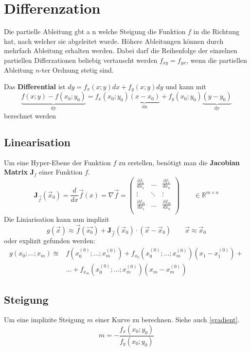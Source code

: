 \section{Differenzation}
Die partielle Ableitung gbt a n welche Steigung die Funktion $f$ in die Richtung hat, nach welcher sie abgeleitet wurde. Höhere Ableitungen können durch mehrfach Ableitung erhalten werden. Dabei darf die Reihenfolge der einzelnen partiellen Differzationen beliebig vertauscht werden $f_{xy} = f_{yx}$, wenn die partiellen Ableitung $n$-ter Ordnung stetig sind.


Das \textbf{Differential}\label{differential} ist $dy = f_x(x;y)dx + f_y(x;y)dy$ und kann mit
\[
\underbrace{f(x;y) - f(x_0;y_0)}_\text{dy} = f_x(x_0; y_0)\underbrace{(x - x_0)}_\text{dx} + f_y(x_0;y_0)\underbrace{(y - y_0)}_\text{dy}
\] berechnet werden

\subsection{Linearisation}
Um eine Hyper-Ebene der Funktion $f$ zu erstellen, benötigt man die \textbf{Jacobian Matrix} $\mathbf{J}_f$ einer Funktion $f$.
\[
\mathbf{J}_{\vec{f}}(\vec{x}_0) = \frac{d}{dx}\vec{f}(x) = \nabla\vec{f} = \begin{pmatrix}
	\frac{\partial f_1}{dx_1} & \dots & \frac{\partial f_1}{dx_n} \\
	\vdots & \ddots & \vdots \\
	\frac{\partial f_m}{dx_1} & \dots & \frac{\partial f_m}{dx_n} \\
\end{pmatrix} \qquad \in \mathbb{R}^{m \times n}
\]
Die Liniarisation kann nun implizit
\[
g(\vec{x}) \approx \vec{f}(\vec{x_0}) + \mathbf{J}_{\vec{f}}(\vec{x}_0) \cdot (\vec{x} - \vec{x}_0)  \qquad \vec{x} \approx \vec{x}_0
\]
oder explizit gefunden werden:
\begin{align*}
	g(x_0; \dots; x_m) \approxeq& f(x_0^{(0)}; \dots; x_m^{(0)}) + f_{x_0}(x_0^{(0)}; \dots; x_m^{(0)})(x_1-x_1^{(0)}) +\\ 
	&\dots + f_{x_m}(x_0^{(0)}; \dots; x_m^{(0)})(x_m-x_m^{(0)})
\end{align*}

\subsection{Steigung}
Um eine implizite Steigung $m$ einer Kurve zu berechnen. Siehe auch \ref{gradient}.
\[
m = - \frac{f_x(x_0;y_0)}{f_y(x_0; y_0)}
\]

